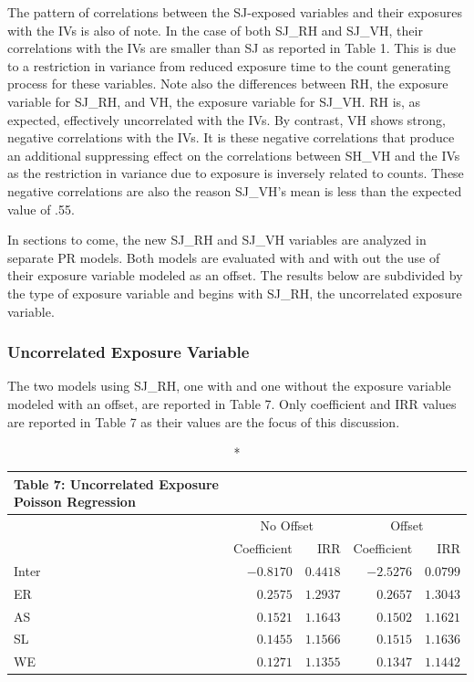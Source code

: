 \documentclass[ShortAfour,times,sageapa]{sagej}
\begin{document}
	The pattern of correlations between the SJ-exposed variables and their exposures with the IVs is also of note. 
	In the case of both SJ\_RH and SJ\_VH, their correlations with the IVs are smaller than SJ as reported in Table 1. 
	This is due to a restriction in variance from reduced exposure time to the count generating process for these variables.
	Note also the differences between RH, the exposure variable for SJ\_RH, and VH, the exposure variable for SJ\_VH.
	RH is, as expected, effectively uncorrelated with the IVs.
	By contrast, VH shows strong, negative correlations with the IVs.
	It is these negative correlations that produce an additional suppressing effect on the correlations between SH\_VH and the IVs as the restriction in variance due to exposure is inversely related to counts.
	These negative correlations are also the reason SJ\_VH's mean is less than  the expected value of .55.
	
	In sections to come, the new SJ\_RH and SJ\_VH variables are analyzed in separate PR models.
	Both models are evaluated with and with out the use of their exposure variable modeled as an offset.
	The results below are subdivided by the type of exposure variable and begins with SJ\_RH, the uncorrelated exposure variable.
	
		\subsubsection{Uncorrelated Exposure Variable}
		
	The two models using SJ\_RH, one with and one without the exposure variable modeled with an offset, are reported in Table 7.
	Only coefficient and IRR values are reported in Table 7 as their values are the focus of this discussion.
		
	\begin{longtable}{l|rrrr}
		\caption*{
			{\large Table 7: Uncorrelated Exposure Poisson Regression}
		} \\ 
		\toprule
		\multicolumn{1}{l}{} & \multicolumn{2}{c}{No Offset} & \multicolumn{2}{c}{Offset} \\ 
		\cmidrule(lr){2-3} \cmidrule(lr){4-5}
		\multicolumn{1}{l}{} & Coefficient & IRR & Coefficient & IRR \\ 
		\midrule
		Inter & $-0.8170$ & $0.4418$ & $-2.5276$ & $0.0799$ \\ 
		ER & $0.2575$ & $1.2937$ & $0.2657$ & $1.3043$ \\ 
		AS & $0.1521$ & $1.1643$ & $0.1502$ & $1.1621$ \\ 
		SL & $0.1455$ & $1.1566$ & $0.1515$ & $1.1636$ \\ 
		WE & $0.1271$ & $1.1355$ & $0.1347$ & $1.1442$ \\ 
		\bottomrule
	\end{longtable}
	
\end{document}
